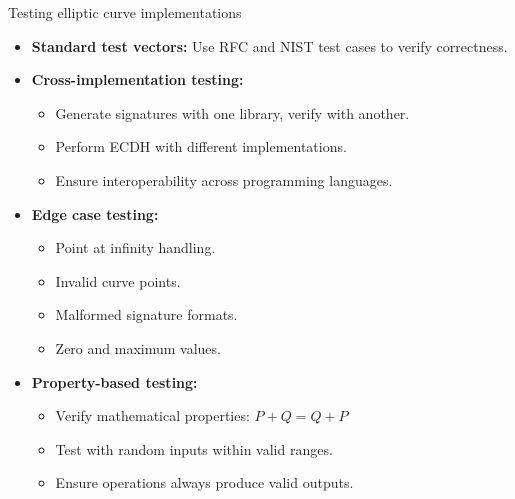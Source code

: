 \documentclass[aspectratio=169, lualatex, handout]{beamer}
\begin{document}
\begin{frame}{Testing elliptic curve implementations}
	\begin{itemize}
		\item \textbf{Standard test vectors:} Use RFC and NIST test cases to verify correctness.
		\item \textbf{Cross-implementation testing:}
		      \begin{itemize}
			      \item Generate signatures with one library, verify with another.
			      \item Perform ECDH with different implementations.
			      \item Ensure interoperability across programming languages.
		      \end{itemize}
		\item \textbf{Edge case testing:}
		      \begin{itemize}
			      \item Point at infinity handling.
			      \item Invalid curve points.
			      \item Malformed signature formats.
			      \item Zero and maximum values.
		      \end{itemize}
		\item \textbf{Property-based testing:}
		      \begin{itemize}
			      \item Verify mathematical properties: $P + Q = Q + P$
			      \item Test with random inputs within valid ranges.
			      \item Ensure operations always produce valid outputs.
		      \end{itemize}
	\end{itemize}
\end{frame}
\end{document}
